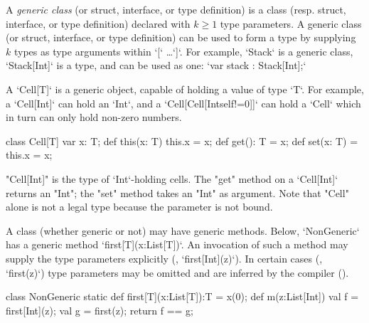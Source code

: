 A {\em generic class} (or struct, interface, or type definition) 
is a class (resp. struct, interface, or type definition) 
declared with $k \geq 1$ type parameters. 
A generic class (or struct, interface, or type definition) 
can be used to form a type by supplying $k$ types as type arguments within
\xcd`[` \ldots \xcd`]`.
For example,
\xcd`Stack` is a generic class, 
\xcd`Stack[Int]` is a type, and can be used as one: 
\xcd`var stack : Stack[Int];`

A \xcd`Cell[T]` is a generic object, capable of holding a value of type
\xcd`T`.  For example, a \xcd`Cell[Int]` can hold an \xcd`Int`, and a
\xcd`Cell[Cell[Int{self!=0}]]` can hold a \xcd`Cell` which in turn can
only hold non-zero numbers. 
\begin{xten}
class Cell[T] {
    var x: T;
    def this(x: T) { this.x = x; }
    def get(): T = x;
    def set(x: T) = { this.x = x; }
}
\end{xten}


\xcd"Cell[Int]" is the type of \xcd`Int`-holding cells.  
The \xcd"get" method on a \xcd`Cell[Int]` returns an \xcd"Int"; the
\xcd"set" method takes an \xcd"Int" as argument.  Note that
\xcd"Cell" alone is not a legal type because the parameter is
not bound.


A class (whether generic or not) may have generic methods.
Below,
\xcd`NonGeneric` has a generic method 
\xcd`first[T](x:List[T])`. An invocation of such a method may supply
the type parameters explicitly (\eg, \xcd`first[Int](z)`).
 In certain cases (\eg, \xcd`first(z)`)
type parameters may
be omitted and are inferred by the compiler ().

\begin{xten}
class NonGeneric {
  static def first[T](x:List[T]):T = x(0);
  def m(z:List[Int]) {
    val f = first[Int](z);
    val g = first(z);
    return f == g;
  }
}
\end{xten}
%

